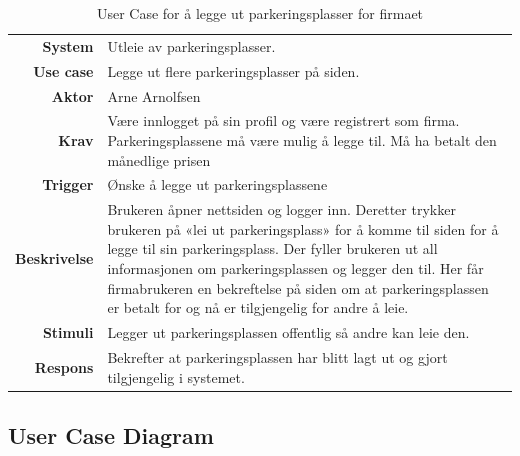 \begin{table}[H]
\begin{tabularx}{\textwidth}{r|X}
\textbf{System}      & Utleie av parkeringsplasser. \\ [.5em]
\textbf{Use case}    &  Legge ut flere parkeringsplasser på siden.  \\ [.5em]
\textbf{Aktor}       & Arne Arnolfsen    \\ [.5em]
\textbf{Krav}        & Være innlogget på sin profil og være registrert som firma. Parkeringsplassene må være mulig å legge til. Må ha betalt den månedlige prisen \vspace{0.5em} \\ 
\textbf{Trigger}     &  Ønske å legge ut parkeringsplassene  \\ [.5em]
\textbf{Beskrivelse} & Brukeren åpner nettsiden og logger inn. Deretter trykker brukeren på «lei ut parkeringsplass» for å komme til siden for å legge til sin parkeringsplass. Der fyller brukeren ut all informasjonen om parkeringsplassen og legger den til. Her får firmabrukeren en bekreftelse på siden om at parkeringsplassen er betalt for og nå er tilgjengelig for andre å leie.  \vspace{0.5em} \\ 
\textbf{Stimuli}     & Legger ut parkeringsplassen offentlig så andre kan leie den. \vspace{0.5em}\\ 
\textbf{Respons}     & Bekrefter at parkeringsplassen har blitt lagt ut og gjort tilgjengelig i systemet.
\end{tabularx}
    \caption{User Case for å legge ut parkeringsplasser for firmaet}
    \label{tab:arne_leggeparkering}
\end{table}





\newpage
\subsection{User Case Diagram}

